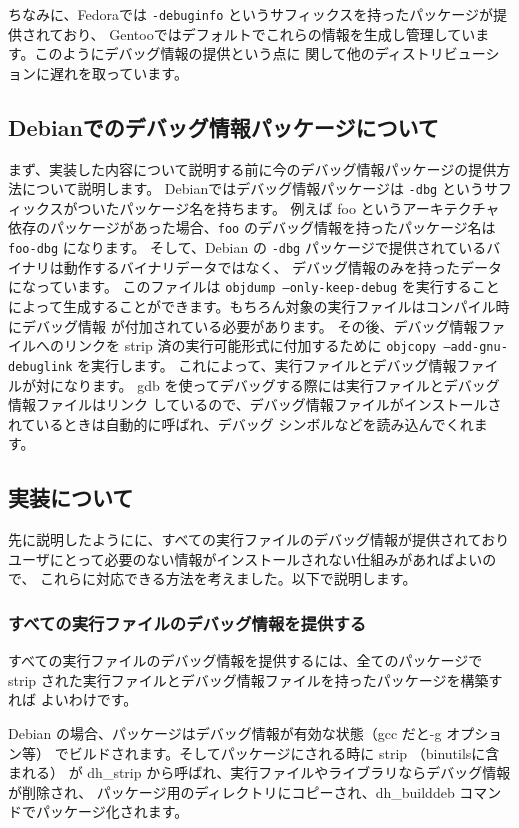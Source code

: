 \documentclass[mingoth,a4paper]{jsarticle}
\begin{document}
ちなみに、Fedoraでは \texttt{-debuginfo} というサフィックスを持ったパッケージが提供されており、
Gentooではデフォルトでこれらの情報を生成し管理しています。このようにデバッグ情報の提供という点に
関して他のディストリビューションに遅れを取っています。

\subsection{Debianでのデバッグ情報パッケージについて}
まず、実装した内容について説明する前に今のデバッグ情報パッケージの提供方法について説明します。
Debianではデバッグ情報パッケージは \texttt{-dbg} というサフィックスがついたパッケージ名を持ちます。
例えば foo というアーキテクチャ依存のパッケージがあった場合、\texttt{foo} のデバッグ情報を持ったパッケージ名は
\texttt{foo-dbg} になります。
そして、Debian の \texttt{-dbg} パッケージで提供されているバイナリは動作するバイナリデータではなく、
デバッグ情報のみを持ったデータになっています。 このファイルは \texttt{objdump --only-keep-debug}
を実行することによって生成することができます。もちろん対象の実行ファイルはコンパイル時にデバッグ情報
が付加されている必要があります。
その後、デバッグ情報ファイルへのリンクを strip 済の実行可能形式に付加するために 
\texttt{objcopy --add-gnu-debuglink} を実行します。
これによって、実行ファイルとデバッグ情報ファイルが対になります。
gdb を使ってデバッグする際には実行ファイルとデバッグ情報ファイルはリンク
しているので、デバッグ情報ファイルがインストールされているときは自動的に呼ばれ、デバッグ
シンボルなどを読み込んでくれます。

\subsection{実装について}

先に説明したようにに、すべての実行ファイルのデバッグ情報が提供されており
ユーザにとって必要のない情報がインストールされない仕組みがあればよいので、
これらに対応できる方法を考えました。以下で説明します。

\subsubsection{すべての実行ファイルのデバッグ情報を提供する}
すべての実行ファイルのデバッグ情報を提供するには、全てのパッケージで
strip された実行ファイルとデバッグ情報ファイルを持ったパッケージを構築すれば
よいわけです。


Debian の場合、パッケージはデバッグ情報が有効な状態（gcc だと-g オプション等）
でビルドされます。そしてパッケージにされる時に strip （binutilsに含まれる）
が dh\_strip から呼ばれ、実行ファイルやライブラリならデバッグ情報が削除され、
パッケージ用のディレクトリにコピーされ、dh\_builddeb コマンドでパッケージ化されます。
\end{document}
